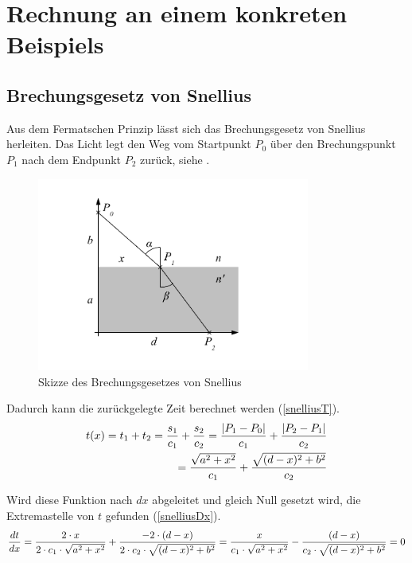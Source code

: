 \section{Rechnung an einem konkreten Beispiels}

\subsection{Brechungsgesetz von Snellius \label{brechungsgesetz}}
\cite{Wikipedia} Aus dem Fermatschen Prinzip lässt sich das Brechungsgesetz von Snellius herleiten.
Das Licht legt den Weg vom Startpunkt $P_0$ über den Brechungspunkt $P_1$ 
nach dem Endpunkt $P_2$ zurück, siehe .
\begin{figure}[H]
	\includegraphics[width=0.8\textwidth]{./picture/Brechung.pdf}
	\caption{Skizze des Brechungsgesetzes von Snellius}
	\label{Ab:brechung}
\end{figure}

Dadurch kann die zurückgelegte Zeit berechnet werden (\eqref{snelliusT}).
\begin{align}
t(x) = t_1 + t_2 = \frac{s_1}{c_1} + \frac{s_2}{c_2} = \frac{|P_1 - P_0|}{c_1} + \frac{|P_2 - P_1|}{c_2} \notag \\
= \frac{\sqrt{a^2 + x^2}}{c_1} + \frac{\sqrt{(d-x)^2 + b^2}}{c_2} \label{snelliusT}
\end{align}

Wird diese Funktion nach $dx$ abgeleitet und gleich Null gesetzt wird, die Extremastelle von $t$ gefunden (\eqref{snelliusDx}).
\begin{equation}
	\frac{dt}{dx} = \frac{2 \cdot x}{2 \cdot c_1 \cdot \sqrt{a^2 + x^2}} + \frac{-2 \cdot (d-x)}{2 \cdot c_2 \cdot \sqrt{(d-x)^2 + b^2}} =
	\frac{x}{c_1 \cdot \sqrt{a^2 + x^2}} - \frac{(d-x)}{c_2 \cdot \sqrt{(d-x)^2 + b^2}} = 0 \label{snelliusDx}\\
\end{equation}

